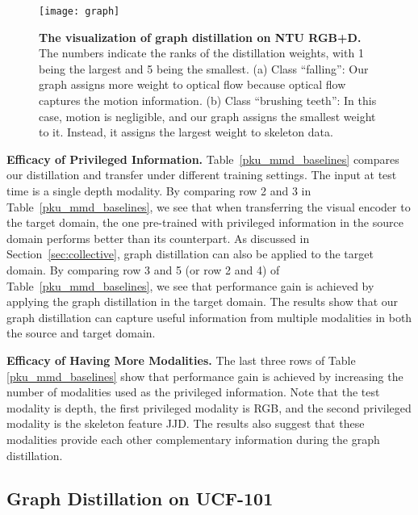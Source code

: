 \begin{figure}[t]
\begin{center}
\texttt{[image: graph]}
\end{center}
\caption{\textbf{The visualization of graph distillation on NTU RGB+D.} The numbers indicate the ranks of the distillation weights, with 1 being the largest and 5 being the smallest. (a) Class ``falling'': Our graph assigns more weight to optical flow because optical flow captures the motion information. (b) Class ``brushing teeth'': In this case, motion is negligible, and our graph assigns the smallest weight to it. Instead, it assigns the largest weight to skeleton data.}
\label{fig:graph}
\end{figure}



\noindent\textbf{Efficacy of Privileged Information.} Table~\ref{pku_mmd_baselines} compares our distillation and transfer under different training settings. The input at test time is a single depth modality. By comparing row 2 and 3 in Table~\ref{pku_mmd_baselines}, we see that when transferring the visual encoder to the target domain, the one pre-trained with privileged information in the source domain performs better than its counterpart. As discussed in Section~\ref{sec:collective}, graph distillation can also be applied to the target domain. By comparing row 3 and 5 (or row 2 and 4) of Table~\ref{pku_mmd_baselines}, we see that performance gain is achieved by applying the graph distillation in the target domain. The results show that our graph distillation can capture useful information from multiple modalities in both the source and target domain.

\noindent\textbf{Efficacy of Having More Modalities.} The last three rows of Table \ref{pku_mmd_baselines} show that performance gain is achieved by increasing the number of modalities used as the privileged information. Note that the test modality is depth, the first privileged modality is RGB, and the second privileged modality is the skeleton feature JJD. The results also suggest that these modalities provide each other complementary information during the graph distillation.



\subsection{Graph Distillation on UCF-101}

